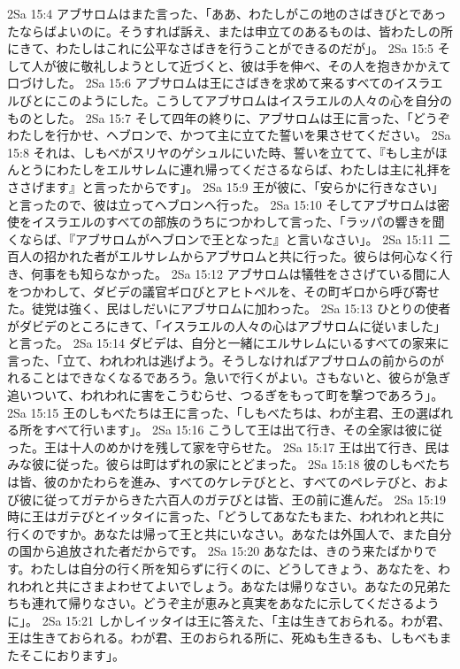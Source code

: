 2Sa 15:4  アブサロムはまた言った、「ああ、わたしがこの地のさばきびとであったならばよいのに。そうすれば訴え、または申立てのあるものは、皆わたしの所にきて、わたしはこれに公平なさばきを行うことができるのだが」。
2Sa 15:5  そして人が彼に敬礼しようとして近づくと、彼は手を伸べ、その人を抱きかかえて口づけした。
2Sa 15:6  アブサロムは王にさばきを求めて来るすべてのイスラエルびとにこのようにした。こうしてアブサロムはイスラエルの人々の心を自分のものとした。
2Sa 15:7  そして四年の終りに、アブサロムは王に言った、「どうぞわたしを行かせ、ヘブロンで、かつて主に立てた誓いを果させてください。
2Sa 15:8  それは、しもべがスリヤのゲシュルにいた時、誓いを立てて、『もし主がほんとうにわたしをエルサレムに連れ帰ってくださるならば、わたしは主に礼拝をささげます』と言ったからです」。
2Sa 15:9  王が彼に、「安らかに行きなさい」と言ったので、彼は立ってヘブロンへ行った。
2Sa 15:10  そしてアブサロムは密使をイスラエルのすべての部族のうちにつかわして言った、「ラッパの響きを聞くならば、『アブサロムがヘブロンで王となった』と言いなさい」。
2Sa 15:11  二百人の招かれた者がエルサレムからアブサロムと共に行った。彼らは何心なく行き、何事をも知らなかった。
2Sa 15:12  アブサロムは犠牲をささげている間に人をつかわして、ダビデの議官ギロびとアヒトペルを、その町ギロから呼び寄せた。徒党は強く、民はしだいにアブサロムに加わった。
2Sa 15:13  ひとりの使者がダビデのところにきて、「イスラエルの人々の心はアブサロムに従いました」と言った。
2Sa 15:14  ダビデは、自分と一緒にエルサレムにいるすべての家来に言った、「立て、われわれは逃げよう。そうしなければアブサロムの前からのがれることはできなくなるであろう。急いで行くがよい。さもないと、彼らが急ぎ追いついて、われわれに害をこうむらせ、つるぎをもって町を撃つであろう」。
2Sa 15:15  王のしもべたちは王に言った、「しもべたちは、わが主君、王の選ばれる所をすべて行います」。
2Sa 15:16  こうして王は出て行き、その全家は彼に従った。王は十人のめかけを残して家を守らせた。
2Sa 15:17  王は出て行き、民はみな彼に従った。彼らは町はずれの家にとどまった。
2Sa 15:18  彼のしもべたちは皆、彼のかたわらを進み、すべてのケレテびとと、すべてのペレテびと、および彼に従ってガテからきた六百人のガテびとは皆、王の前に進んだ。
2Sa 15:19  時に王はガテびとイッタイに言った、「どうしてあなたもまた、われわれと共に行くのですか。あなたは帰って王と共にいなさい。あなたは外国人で、また自分の国から追放された者だからです。
2Sa 15:20  あなたは、きのう来たばかりです。わたしは自分の行く所を知らずに行くのに、どうしてきょう、あなたを、われわれと共にさまよわせてよいでしょう。あなたは帰りなさい。あなたの兄弟たちも連れて帰りなさい。どうぞ主が恵みと真実をあなたに示してくださるように」。
2Sa 15:21  しかしイッタイは王に答えた、「主は生きておられる。わが君、王は生きておられる。わが君、王のおられる所に、死ぬも生きるも、しもべもまたそこにおります」。
